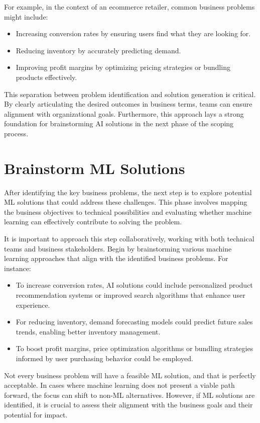 \documentclass[12pt,openany, draft]{book}
\begin{document}
For example, in the context of an ecommerce retailer, common business problems might include:
\begin{itemize}
    \item Increasing conversion rates by ensuring users find what they are looking for.
    \item Reducing inventory by accurately predicting demand.
    \item Improving profit margins by optimizing pricing strategies or bundling products effectively.
\end{itemize}

This separation between problem identification and solution generation is critical. By clearly articulating the desired outcomes in business terms, teams can ensure alignment with organizational goals. Furthermore, this approach lays a strong foundation for brainstorming AI solutions in the next phase of the scoping process.


\section{Brainstorm ML Solutions}

After identifying the key business problems, the next step is to explore potential ML solutions that could address these challenges. This phase involves mapping the business objectives to technical possibilities and evaluating whether machine learning can effectively contribute to solving the problem.
\newline

It is important to approach this step collaboratively, working with both technical teams and business stakeholders. Begin by brainstorming various machine learning approaches that align with the identified business problems. For instance:
\begin{itemize}
    \item To increase conversion rates, AI solutions could include personalized product recommendation systems or improved search algorithms that enhance user experience.
    \item For reducing inventory, demand forecasting models could predict future sales trends, enabling better inventory management.
    \item To boost profit margins, price optimization algorithms or bundling strategies informed by user purchasing behavior could be employed.
\end{itemize}

Not every business problem will have a feasible ML solution, and that is perfectly acceptable. In cases where machine learning does not present a viable path forward, the focus can shift to non-ML alternatives. However, if ML solutions are identified, it is crucial to assess their alignment with the business goals and their potential for impact.
\end{document}
